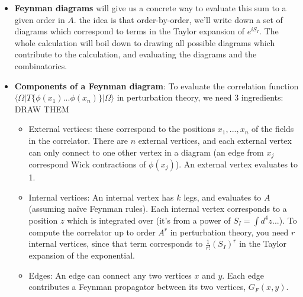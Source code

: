 \documentclass[12pt, oneside]{article}   	%
\theoremstyle{definition}
\begin{document}
\begin{itemize}
	\item \textbf{Feynman diagrams} will give us a concrete way to evaluate this sum to a given order in $A$. the idea is that order-by-order, we'll write down a set of diagrams which correspond to terms in the Taylor expansion of $e^{i S_I}$. The whole calculation will boil down to drawing all possible diagrams which contribute to the calculation, and evaluating the diagrams and the combinatorics. 

	\item \textbf{Components of a Feynman diagram}: To evaluate the correlation function $\langle \Omega | T\{ \phi(x_1) ... \phi(x_n) \} | \Omega \rangle$ in perturbation theory, we need 3 ingredients: {\color{red} DRAW THEM}
	\begin{itemize}
		\item External vertices: these correspond to the positions $x_1, ..., x_n$ of the fields in the correlator. There are $n$ external vertices, and each external vertex can only connect to one other vertex in a diagram (an edge from $x_j$ correspond Wick contractions of $\phi(x_j)$). An external vertex evaluates to 1. 
		\item Internal vertices: An internal vertex has $k$ legs, and evaluates to $A$ (assuming na\"ive Feynman rules). Each internal vertex corresponds to a position $z$ which is integrated over (it's from a power of $S_I = \int d^4 z ...$). To compute the correlator up to order $A^r$ in perturbation theory, you need $r$ internal vertices, since that term corresponds to $\frac{1}{r!} (S_I)^r$ in the Taylor expansion of the exponential. 
		\item Edges: An edge can connect any two vertices $x$ and $y$. Each edge contributes a Feynman propagator between its two vertices, $G_F(x, y)$.
	\end{itemize}
	

\end{itemize}
\end{document}
